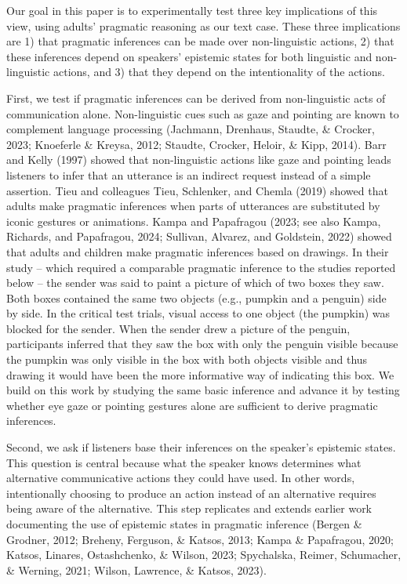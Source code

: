 \documentclass[
  man,floatsintext]{apa6}
\begin{document}
Our goal in this paper is to experimentally test three key implications of this view, using adults' pragmatic reasoning as our text case. These three implications are 1) that pragmatic inferences can be made over non-linguistic actions, 2) that these inferences depend on speakers' epistemic states for both linguistic and non-linguistic actions, and 3) that they depend on the intentionality of the actions.

First, we test if pragmatic inferences can be derived from non-linguistic acts of communication alone. Non-linguistic cues such as gaze and pointing are known to complement language processing (Jachmann, Drenhaus, Staudte, \& Crocker, 2023; Knoeferle \& Kreysa, 2012; Staudte, Crocker, Heloir, \& Kipp, 2014). Barr and Kelly (1997) showed that non-linguistic actions like gaze and pointing leads listeners to infer that an utterance is an indirect request instead of a simple assertion. Tieu and colleagues Tieu, Schlenker, and Chemla (2019) showed that adults make pragmatic inferences when parts of utterances are substituted by iconic gestures or animations. Kampa and Papafragou (2023; see also Kampa, Richards, and Papafragou, 2024; Sullivan, Alvarez, and Goldstein, 2022) showed that adults and children make pragmatic inferences based on drawings. In their study -- which required a comparable pragmatic inference to the studies reported below -- the sender was said to paint a picture of which of two boxes they saw. Both boxes contained the same two objects (e.g., pumpkin and a penguin) side by side. In the critical test trials, visual access to one object (the pumpkin) was blocked for the sender. When the sender drew a picture of the penguin, participants inferred that they saw the box with only the penguin visible because the pumpkin was only visible in the box with both objects visible and thus drawing it would have been the more informative way of indicating this box. We build on this work by studying the same basic inference and advance it by testing whether eye gaze or pointing gestures alone are sufficient to derive pragmatic inferences.

Second, we ask if listeners base their inferences on the speaker's epistemic states. This question is central because what the speaker knows determines what alternative communicative actions they could have used. In other words, intentionally choosing to produce an action instead of an alternative requires being aware of the alternative. This step replicates and extends earlier work documenting the use of epistemic states in pragmatic inference (Bergen \& Grodner, 2012; Breheny, Ferguson, \& Katsos, 2013; Kampa \& Papafragou, 2020; Katsos, Linares, Ostashchenko, \& Wilson, 2023; Spychalska, Reimer, Schumacher, \& Werning, 2021; Wilson, Lawrence, \& Katsos, 2023).
\end{document}
